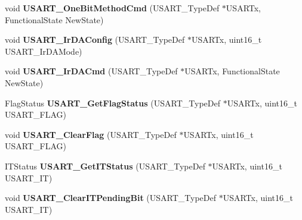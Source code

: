 \begin{DoxyCompactItemize}
\item 
\hypertarget{group__USART__Exported__Functions_ga3ed89ea8765d851510cfe90f7d90cbbb}{
void {\bfseries USART\_\-OneBitMethodCmd} (USART\_\-TypeDef $\ast$USARTx, FunctionalState NewState)}
\label{group__USART__Exported__Functions_ga3ed89ea8765d851510cfe90f7d90cbbb}

\item 
\hypertarget{group__USART__Exported__Functions_ga81a0cd36199040bf6d266b57babd678e}{
void {\bfseries USART\_\-IrDAConfig} (USART\_\-TypeDef $\ast$USARTx, uint16\_\-t USART\_\-IrDAMode)}
\label{group__USART__Exported__Functions_ga81a0cd36199040bf6d266b57babd678e}

\item 
\hypertarget{group__USART__Exported__Functions_gabff56ebb494fdfadcc6ef4fe9ac8dd24}{
void {\bfseries USART\_\-IrDACmd} (USART\_\-TypeDef $\ast$USARTx, FunctionalState NewState)}
\label{group__USART__Exported__Functions_gabff56ebb494fdfadcc6ef4fe9ac8dd24}

\item 
\hypertarget{group__USART__Exported__Functions_ga144630722defc9e312f0ad280b68e9da}{
FlagStatus {\bfseries USART\_\-GetFlagStatus} (USART\_\-TypeDef $\ast$USARTx, uint16\_\-t USART\_\-FLAG)}
\label{group__USART__Exported__Functions_ga144630722defc9e312f0ad280b68e9da}

\item 
\hypertarget{group__USART__Exported__Functions_gad962e148fc466ae1b45b288f6c91d966}{
void {\bfseries USART\_\-ClearFlag} (USART\_\-TypeDef $\ast$USARTx, uint16\_\-t USART\_\-FLAG)}
\label{group__USART__Exported__Functions_gad962e148fc466ae1b45b288f6c91d966}

\item 
\hypertarget{group__USART__Exported__Functions_ga93d8f031241bcdbe938d091a85295445}{
ITStatus {\bfseries USART\_\-GetITStatus} (USART\_\-TypeDef $\ast$USARTx, uint16\_\-t USART\_\-IT)}
\label{group__USART__Exported__Functions_ga93d8f031241bcdbe938d091a85295445}

\item 
\hypertarget{group__USART__Exported__Functions_ga1fc25d0338695063be5e50156955d9bc}{
void {\bfseries USART\_\-ClearITPendingBit} (USART\_\-TypeDef $\ast$USARTx, uint16\_\-t USART\_\-IT)}
\label{group__USART__Exported__Functions_ga1fc25d0338695063be5e50156955d9bc}

\end{DoxyCompactItemize}
